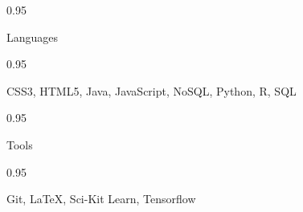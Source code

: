 \documentclass[a4paper,9pt]{article}
\newcommand{\doubleColumnGap}{\hspace{4mm}}
\newcommand{\withinSectionMarginBetween}{\vspace{-3ex}}
\newcommand{\mainLineSpacing}{0.95}
\begin{document}
\withinSectionMarginBetween{}

\begin{minipage}[t]{0.20\linewidth}
	\begin{small}
		\begin{spacing}\mainLineSpacing{}
			\begin{flushright}
				Languages
			\end{flushright}
		\end{spacing}
	\end{small}
\end{minipage}
\doubleColumnGap{}
\begin{minipage}[t]{0.75\linewidth}
	\begin{small}
		\begin{spacing}\mainLineSpacing{}
			\begin{flushleft}
				CSS3, HTML5, Java, JavaScript, NoSQL, Python, R, SQL
			\end{flushleft}
		\end{spacing}
	\end{small}
\end{minipage}


\withinSectionMarginBetween{}

\begin{minipage}[t]{0.20\linewidth}
	\begin{small}
		\begin{spacing}\mainLineSpacing{}
			\begin{flushright}
				Tools
			\end{flushright}
		\end{spacing}
	\end{small}
\end{minipage}
\doubleColumnGap{}
\begin{minipage}[t]{0.75\linewidth}
	\begin{small}
		\begin{spacing}\mainLineSpacing{}
			\begin{flushleft}
				Git, \LaTeX, Sci-Kit Learn, Tensorflow
			\end{flushleft}
		\end{spacing}
	\end{small}
\end{minipage}
\end{document}
